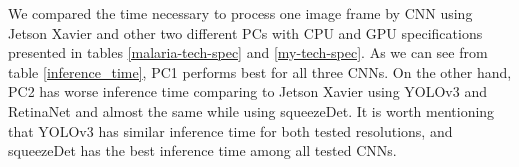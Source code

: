 \documentclass[twoside]{ctuthesis}
\theoremstyle{plain}
\theoremstyle{definition}
\theoremstyle{note}
\begin{document}
        
We compared the time necessary to process one image frame by CNN using Jetson Xavier and other two different PCs with CPU and GPU specifications presented in tables \ref{malaria-tech-spec} and \ref{my-tech-spec}.  As we can see from table \ref{inference_time}, PC1 performs best for all three CNNs. On the other hand, PC2 has worse inference time comparing to Jetson Xavier using YOLOv3 and RetinaNet and almost the same while using squeezeDet. It is worth mentioning that YOLOv3 has similar inference time for both tested resolutions, and squeezeDet has the best inference time among all tested CNNs.
\begin{table}[htb]
        \centering
        \caption{PC1 technical specification}
        \label{malaria-tech-spec}
\end{table}
\begin{table}[htb]
        \centering
        \caption{PC2 technical specification}
        \label{my-tech-spec}
\end{table}
\end{document}
